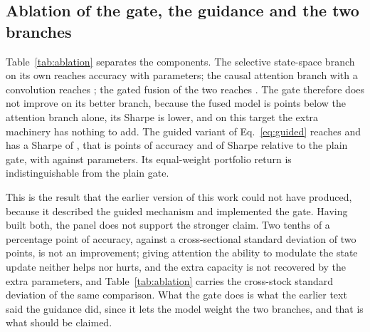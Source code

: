 \documentclass[pdflatex,sn-mathphys-ay]{sn-jnl}
\theoremstyle{thmstyleone}%
\theoremstyle{thmstyletwo}%
\theoremstyle{thmstyletwo}%
\begin{document}
\begin{table}[!ht]
	\centering
	\caption{Mixing the model score with four cheap factors, weekly on the liquid half, with the weight scanned from zero to one. Costs are the commission, transfer fee, stamp duty and slippage, the square-root impact at a reference book of 100 million CNY per leg, and the borrow fee on the short leg, so the gross return less the costs is the net return. The tradability filter of Table~\ref{tab:realcost} is applied here as well, so the two tables differ only in the universe, this one being the liquid half of the panel, and in the reference book size.}
	\label{tab:combine}
	
\end{table}

\subsection{Ablation of the gate, the guidance and the two branches}\label{sec:ablation}

Table~\ref{tab:ablation} separates the components. The selective state-space branch on its own
reaches \accSSM{} accuracy with \paramSSM{} parameters; the causal attention branch with a
convolution reaches \accAtt{}; the gated fusion of the two reaches \accProp{}. The gate therefore
does not improve on its better branch, because the fused model is \nGateGain{} points below the
attention branch alone, its Sharpe is lower, and on this target the extra machinery has nothing to
add. The
guided variant of Eq.~\eqref{eq:guided} reaches \accGuided{} and has a Sharpe of
\shGuided, that is \accGuidedMinusPlain{} points of accuracy and \shGuidedMinusPlain{} of Sharpe
relative to the plain gate, with \paramGuided{} against \paramProposed{} parameters. Its equal-weight
portfolio return is indistinguishable from the plain gate.

This is the result that the earlier version of this work could not have produced, because it
described the guided mechanism and implemented the gate. Having built both, the panel does not
support the stronger claim. Two tenths of a percentage point of accuracy, against a cross-sectional
standard deviation of two points, is not an improvement; giving attention the ability to modulate the
state update neither helps nor hurts, and the extra capacity is not recovered by the extra
parameters, and Table~\ref{tab:ablation} carries the cross-stock standard deviation of the same
comparison. What the gate does
is what the earlier text said the guidance did, since it lets the model weight the two branches, and
that is what should be claimed.
\end{document}

